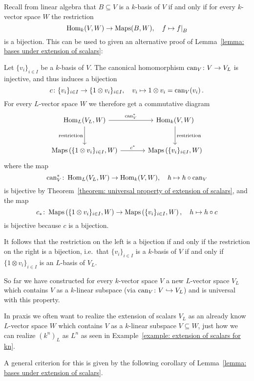 \begin{remark}
  Recall from linear algebra that $B \subseteq V$ is a $k$-basis of $V$ if and only if for every $k$-vector space $W$ the restriction
  \[
            \Hom_k(V,W)
    \to     \Maps(B,W),
    \quad   f
    \mapsto \restrict{f}{B}
  \]
  is a bijection.
  This can be used to given an alternative proof of Lemma~\ref{lemma: bases under extension of scalars}:
  
  Let $\{v_i\}_{i \in I}$ be a $k$-basis of $V$.
  The canonical homomorphism $\operatorname{can}_V \colon V \to V_L$ is injective, and thus induces a bijection
  \[
            c
    \colon  \{v_i\}_{i \in I}
    \to     \{1 \otimes v_i\}_{i \in I},
    \quad   v_i
    \mapsto 1 \otimes v_i
    =       \operatorname{can}_V(v_i) \,.
  \]
  For every $L$-vector space $W$ we therefore get a commutative diagram
  \[
    \begin{tikzcd}[sep = large]
        \Hom_L(V_L, W)
        \arrow{r}[above]{\can_V^*}
        \arrow{d}[left]{\text{restriction}}
      & \Hom_k(V,W)
        \arrow{d}[right]{\text{restriction}}
      \\
        \Maps\left( \{1 \otimes v_i\}_{i \in I}, W \right)
        \arrow{r}[above]{c^*}
      & \Maps\left( \{v_i\}_{i \in I}, W \right)
    \end{tikzcd}
  \]
  where the map
  \[
            \operatorname{can}_V^*
    \colon  \operatorname{Hom}_L(V_L, W)
    \to     \operatorname{Hom}_k(V, W),
    \quad   h
    \mapsto h \circ \operatorname{can}_V
  \]
  is bijective by Theorem~\ref{theorem: universal property of extension of scalars}, and the map
  \[
            c_*
    \colon  \operatorname{Maps}\left( \{1 \otimes v_i\}_{i \in I}, W \right)
    \to     \operatorname{Maps}\left( \{v_i\}_{i \in I}, W \right),
    \quad   h
    \mapsto h \circ c
  \]
  is bijective because $c$ is a bijection.
  
  It follows that the restriction on the left is a bijection if and only if the restriction on the right is a bijection, i.e.\ that $\{v_i\}_{i \in I}$ is a $k$-basis of $V$ if and only if $\{1 \otimes v_i\}_{i \in I}$ is an $L$-basis of $V_L$.
\end{remark}


\begin{fluff}
  So far we have constructed for every $k$-vector space $V$ a new $L$-vector space $V_L$ which contains $V$ as a $k$-linear subspace (via $\operatorname{can}_V \colon V \hookrightarrow V_L$) and is universal with this property.
  
  In praxis we often want to realize the extension of scalars $V_L$ as an already know $L$-vector space $W$ which contains $V$ as a $k$-linear subspace $V \subseteq W$, just how we can realize $(k^n)_L$ as $L^n$ as seen in Example~\ref{example: extension of scalars for kn}.
  
  A general criterion for this is given by the following corollary of Lemma~\ref{lemma: bases under extension of scalars}.
\end{fluff}


